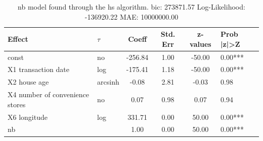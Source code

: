 \begin{table}
	\caption{nb model found through the hs algorithm. bic: 273871.57 Log-Likelihood: -136920.22 MAE: 10000000.00}
	\begin{center}
		\begin{tabular}{|l|l|c|c|c|l|}
			\hline
			Effect & $\tau$ & Coeff & Std. Err & z-values & Prob |z|>Z \\
			\hline
			const & no & -256.84 & 1.00 & -50.00 & 0.00*** \\
			\hline
			X1 transaction date & log & -175.41 & 1.18 & -50.00 & 0.00*** \\
			\hline
			X2 house age & arcsinh & -0.08 & 2.81 & -0.03 & 0.98 \\
			\hline
			X4 number of convenience stores & no & 0.07 & 0.98 & 0.07 & 0.94 \\
			\hline
			X6 longitude & log & 331.71 & 0.00 & 50.00 & 0.00*** \\
			\hline
			nb &  & 1.00 & 0.00 & 50.00 & 0.00*** \\
			\hline
		\end{tabular}
	\end{center}
\end{table}